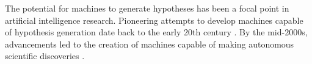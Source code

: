 The potential for machines to generate hypotheses has been a focal point in artificial intelligence research. Pioneering attempts to develop machines capable of hypothesis generation date back to the early 20th century \cite{langley1987scientific,lindsay1993dendral}. By the mid-2000s, advancements led to the creation of machines capable of making autonomous scientific discoveries \cite{king2004functional}.




